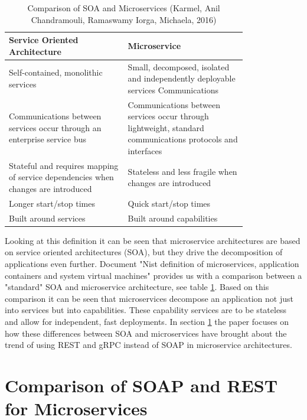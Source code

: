 \documentclass[conference]{IEEEtran}
\begin{document}
\begin{table}[!htbp]
	\centering
	\caption{Comparison of SOA and Microservices (Karmel, Anil
		Chandramouli, Ramaswamy
		Iorga, Michaela, 2016)}
	\label{micro:comparison}
	\begin{tabular}{| p{0.4\linewidth} | p{0.4\linewidth}|}\hline
		Service Oriented Architecture & Microservice \\\hline
	Self-contained, monolithic services & Small, decomposed, isolated and independently deployable services Communications\\\hline
		Communications between services occur through an enterprise service bus & Communications between services occur through lightweight, standard communications protocols and interfaces\\\hline
		Stateful and requires mapping of service dependencies when changes are introduced & Stateless and less fragile when changes are introduced\\\hline
		Longer start/stop times & Quick start/stop times\\\hline
		Built around services & Built around capabilities\\\hline
	\end{tabular}
\end{table}

Looking at this definition it can be seen that microservice architectures are based on service oriented architectures (SOA), but they drive the decomposition of applications even further. Document "Nist definition of microservices, application containers and system virtual machines" \cite{karmel2016nist} provides us with a comparison between a "standard" SOA and microservice architecture, see table \ref{micro:comparison}. Based on this comparison it can be seen that microservices decompose an application not just into services but into capabilities. These capability services are to be stateless and allow for independent, fast deployments. In section \ref{sec:comp} the paper focuses on how these differences between SOA and microservices have brought about the trend of using REST and gRPC instead of SOAP in microservice architectures.

\section{Comparison of SOAP and REST for Microservices}
\label{sec:comp}
\end{document}
